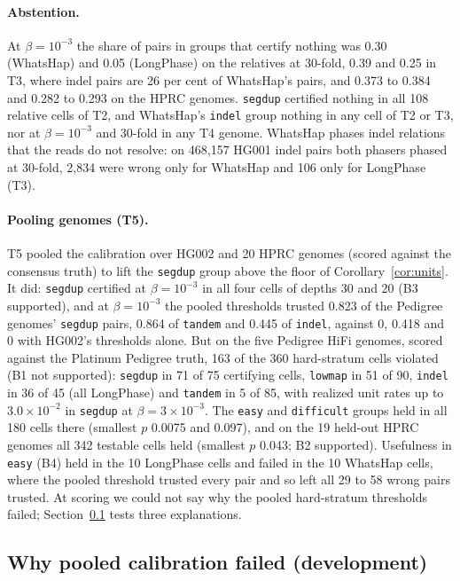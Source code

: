 \documentclass[11pt]{article}
\theoremstyle{definition}
\theoremstyle{remark}
\begin{document}
\paragraph{Abstention.} At $\beta=10^{-3}$ the share of pairs in groups that
certify nothing was 0.30 (WhatsHap) and 0.05 (LongPhase) on the relatives at
30-fold, 0.39 and 0.25 in T3, where indel pairs are 26 per cent of
WhatsHap's pairs, and 0.373 to 0.384 and 0.282 to 0.293 on the HPRC genomes.
\texttt{segdup} certified nothing in all 108 relative cells of T2, and
WhatsHap's \texttt{indel} group nothing in any cell of T2 or T3, nor at
$\beta=10^{-3}$ and 30-fold in any T4 genome.
WhatsHap phases indel relations that the reads do not resolve: on 468{,}157
HG001 indel pairs both phasers phased at 30-fold, 2{,}834 were wrong only for
WhatsHap and 106 only for LongPhase (T3).

\paragraph{Pooling genomes (T5).} T5 pooled the calibration over HG002 and
20 HPRC genomes (scored against the consensus truth) to lift the
\texttt{segdup} group above the floor of Corollary~\ref{cor:units}. It did:
\texttt{segdup} certified at $\beta=10^{-3}$ in all four cells of depths 30
and 20 (B3 supported), and at $\beta=10^{-3}$ the pooled thresholds trusted
0.823 of the Pedigree genomes' \texttt{segdup} pairs, 0.864 of
\texttt{tandem} and 0.445 of \texttt{indel}, against 0, 0.418 and 0 with
HG002's thresholds alone. But on the five Pedigree HiFi genomes, scored
against the Platinum Pedigree truth, 163 of the 360 hard-stratum cells
violated (B1 not supported): \texttt{segdup} in 71 of 75 certifying cells,
\texttt{lowmap} in 51 of 90, \texttt{indel} in 36 of 45 (all LongPhase) and
\texttt{tandem} in 5 of 85, with realized unit rates up to $3.0\times10^{-2}$
in \texttt{segdup} at $\beta=3\times10^{-3}$. The \texttt{easy} and
\texttt{difficult} groups held in all 180 cells there (smallest $p$ 0.0075
and 0.097), and on the 19 held-out HPRC genomes all 342 testable cells held
(smallest $p$ 0.043; B2 supported). Usefulness in \texttt{easy} (B4) held in
the 10 LongPhase cells and failed in the 10 WhatsHap cells, where the pooled
threshold trusted every pair and so left all 29 to 58 wrong pairs trusted.
At scoring we could not say why the pooled hard-stratum thresholds failed;
Section~\ref{sec:t5cause} tests three explanations.

\subsection{Why pooled calibration failed (development)}\label{sec:t5cause}
\end{document}
